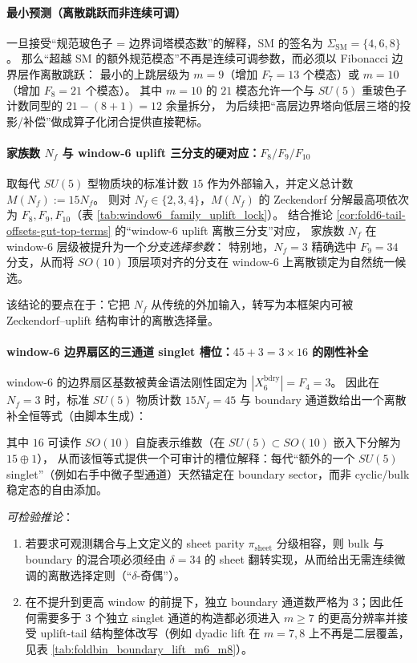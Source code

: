 \paragraph{最小预测（离散跳跃而非连续可调）}
一旦接受“规范玻色子 = 边界词塔模态数”的解释，SM 的签名为
\(\Sigma_{\mathrm{SM}}=\{4,6,8\}\)。
那么“超越 SM 的额外规范模态”不再是连续可调参数，而必须以 Fibonacci 边界层作离散跳跃：
最小的上跳层级为 \(m=9\)（增加 \(F_7=13\) 个模态）或 \(m=10\)（增加 \(F_8=21\) 个模态）。
其中 \(m=10\) 的 \(21\) 模态允许一个与 \(SU(5)\) 重玻色子计数同型的 \(21-(8+1)=12\) 余量拆分，
为后续把“高层边界塔向低层三塔的投影/补偿”做成算子化闭合提供直接靶标。

\paragraph{家族数 \(N_f\) 与 window-6 uplift 三分支的硬对应：\(F_8/F_9/F_{10}\)}
取每代 \(SU(5)\) 型物质块的标准计数 \(15\) 作为外部输入，并定义总计数
\(
M(N_f):=15N_f
\)。
则对 \(N_f\in\{2,3,4\}\)，\(M(N_f)\) 的 Zeckendorf 分解最高项依次为 \(F_8,F_9,F_{10}\)（表 \ref{tab:window6_family_uplift_lock}）。
结合推论 \ref{cor:fold6-tail-offsets-gut-top-terms} 的“window-6 uplift 离散三分支”对应，
家族数 \(N_f\) 在 window-6 层级被提升为一个\emph{分支选择参数}：
特别地，\(N_f=3\) 精确选中 \(F_9=34\) 分支，从而将 \(SO(10)\) 顶层项对齐的分支在 window-6 上离散锁定为自然统一候选。

\par
该结论的要点在于：它把 \(N_f\) 从传统的外加输入，转写为本框架内可被 Zeckendorf--uplift 结构审计的离散选择量。

\paragraph{window-6 边界扇区的三通道 singlet 槽位：\(45+3=3\times 16\) 的刚性补全}
window-6 的边界扇区基数被黄金语法刚性固定为 \(|X_6^{\mathrm{bdry}}|=F_4=3\)。
因此在 \(N_f=3\) 时，标准 \(SU(5)\) 物质计数 \(15N_f=45\) 与 boundary 通道数给出一个离散补全恒等式（由脚本生成）：

其中 \(16\) 可读作 \(SO(10)\) 自旋表示维数（在 \(SU(5)\subset SO(10)\) 嵌入下分解为 \(15\oplus 1\)），
从而该恒等式提供一个可审计的槽位解释：每代“额外的一个 \(SU(5)\) singlet”（例如右手中微子型通道）天然锚定在 boundary sector，而非 cyclic/bulk 稳定态的自由添加。
\par
\emph{可检验推论}：
\begin{enumerate}
  \item 若要求可观测耦合与上文定义的 sheet parity \(\pi_{\mathrm{sheet}}\) 分级相容，则 bulk 与 boundary 的混合项必须经由 \(\delta=34\) 的 sheet 翻转实现，从而给出无需连续微调的离散选择定则（“\(\delta\)-奇偶”）。
  \item 在不提升到更高 window 的前提下，独立 boundary 通道数严格为 \(3\)；因此任何需要多于 \(3\) 个独立 singlet 通道的构造都必须进入 \(m\ge 7\) 的更高分辨率并接受 uplift-tail 结构整体改写（例如 dyadic lift 在 \(m=7,8\) 上不再是二层覆盖，见表 \ref{tab:foldbin_boundary_lift_m6_m8}）。
\end{enumerate}

